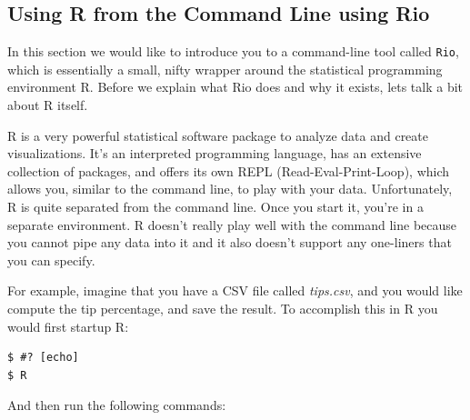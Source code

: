 \documentclass[
]{book}
\newenvironment{Shaded}{\begin{snugshade}}{\end{snugshade}}
\newcommand{\CharTok}[1]{\textcolor[rgb]{0.31,0.60,0.02}{#1}}
\newcommand{\DataTypeTok}[1]{\textcolor[rgb]{0.13,0.29,0.53}{#1}}
\newcommand{\DecValTok}[1]{\textcolor[rgb]{0.00,0.00,0.81}{#1}}
\newcommand{\KeywordTok}[1]{\textcolor[rgb]{0.13,0.29,0.53}{\textbf{#1}}}
\newcommand{\NormalTok}[1]{#1}
\newcommand{\OperatorTok}[1]{\textcolor[rgb]{0.81,0.36,0.00}{\textbf{#1}}}
\newcommand{\StringTok}[1]{\textcolor[rgb]{0.31,0.60,0.02}{#1}}
\theoremstyle{definition}
\theoremstyle{definition}
\theoremstyle{definition}
\theoremstyle{remark}
\begin{document}
\hypertarget{using-r-from-the-command-line-using-rio}{%
\subsection{Using R from the Command Line using Rio}\label{using-r-from-the-command-line-using-rio}}

In this section we would like to introduce you to a command-line tool called \texttt{Rio}, which is essentially a small, nifty wrapper around the statistical programming environment R. Before we explain what Rio does and why it exists, lets talk a bit about R itself.

R is a very powerful statistical software package to analyze data and create visualizations. It's an interpreted programming language, has an extensive collection of packages, and offers its own REPL (Read-Eval-Print-Loop), which allows you, similar to the command line, to play with your data. Unfortunately, R is quite separated from the command line. Once you start it, you're in a separate environment. R doesn't really play well with the command line because you cannot pipe any data into it and it also doesn't support any one-liners that you can specify.

For example, imagine that you have a CSV file called \emph{tips.csv}, and you would like compute the tip percentage, and save the result. To accomplish this in R you would first startup R:

\begin{verbatim}
$ #? [echo]
$ R
\end{verbatim}

And then run the following commands:

\begin{Shaded}
\end{Shaded}
\end{document}
